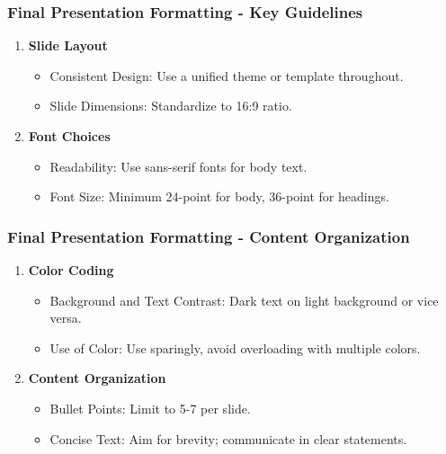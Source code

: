 \documentclass[aspectratio=169]{beamer}
\begin{document}
\begin{frame}[fragile]
    \frametitle{Final Presentation Formatting - Key Guidelines}
    \begin{enumerate}
        \item \textbf{Slide Layout}
            \begin{itemize}
                \item Consistent Design: Use a unified theme or template throughout.
                \item Slide Dimensions: Standardize to 16:9 ratio.
            \end{itemize}
        \item \textbf{Font Choices}
            \begin{itemize}
                \item Readability: Use sans-serif fonts for body text.
                \item Font Size: Minimum 24-point for body, 36-point for headings.
            \end{itemize}
    \end{enumerate}
\end{frame}

\begin{frame}[fragile]
    \frametitle{Final Presentation Formatting - Content Organization}
    \begin{enumerate}[resume]
        \item \textbf{Color Coding}
            \begin{itemize}
                \item Background and Text Contrast: Dark text on light background or vice versa.
                \item Use of Color: Use sparingly, avoid overloading with multiple colors.
            \end{itemize}
        \item \textbf{Content Organization}
            \begin{itemize}
                \item Bullet Points: Limit to 5-7 per slide.
                \item Concise Text: Aim for brevity; communicate in clear statements.
            \end{itemize}
    \end{enumerate}
\end{frame}
\end{document}
